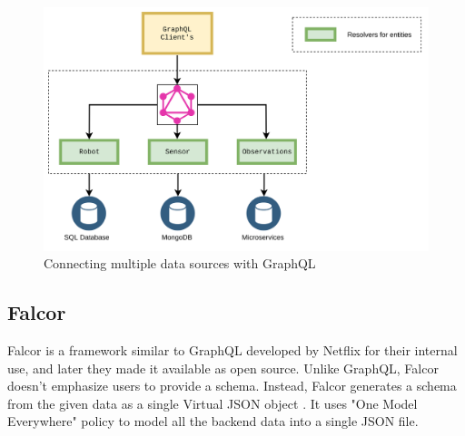 	\begin{figure}[!htbp] 
		\begin{center}
			\includegraphics[trim={0 0 0 2cm},clip,scale=0.07]{./images/png/multiple_db_support}	
			\caption{ Connecting multiple data sources with GraphQL}	
			\label{fig:multiple_db_support}	
		\end{center}
	\end{figure}

	\subsection{Falcor}
	Falcor is a framework similar to GraphQL developed by Netflix for their internal use, and later they made it available as open source. Unlike GraphQL, Falcor doesn't emphasize users to provide a schema. Instead, Falcor generates a schema from the given data as a single Virtual JSON object \cite{misc03}. It uses "One Model Everywhere" \cite{misc03} policy to model all the backend data into a single JSON file.
	
